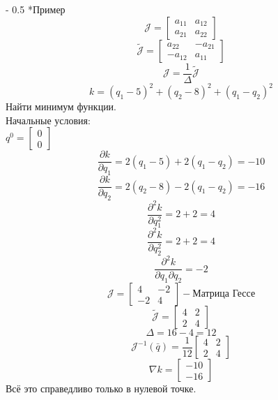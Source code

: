 \documentclass[12pt,a5paper]{scrbook}
\makeatletter
\renewcommand\paragraph{\@startsection{paragraph}{4}{0mm}%
{-\baselineskip} %
{0.5\baselineskip} %
{\normalfont\bfseries}}%
\makeatother
\begin{document}
  \paragraph*{Пример}
  $$
    \mathcal{J} =
    \begin{bmatrix}
      a_{11} & a_{12}\\
      a_{21} & a_{22}
    \end{bmatrix}
  $$
  $$
    \tilde{\mathcal{J}} =
    \begin{bmatrix}
      a_{22} & -a_{21}\\
      -a_{12} & a_{11}
    \end{bmatrix}
  $$
  $$
    \mathcal{J} = \frac{1}{\Delta}\mathcal{\tilde{J}}
  $$  
  $$k = (q_1 - 5)^2 + (q_2 - 8)^2 + (q_1 - q_2)^2$$
  Найти минимум функции.\\
  Начальные условия:\\
  $q^0 = 
  \begin{bmatrix}
    0 \\ 
    0    
  \end{bmatrix}$
  $$\frac{\partial k}{\partial q_1} = 2(q_1 - 5) + 2(q_1 - q_2) = -10$$
  $$\frac{\partial k}{\partial q_2} = 2(q_2 - 8) - 2(q_1 - q_2) = -16$$
  $$\frac{\partial^2k}{\partial q_1^2} = 2 + 2 = 4$$
  $$\frac{\partial^2k}{\partial q_2^2} = 2 + 2 = 4$$
  $$\frac{\partial^2k}{\partial q_1 \partial q_2} = -2$$  
  $$\mathcal{J} = 
  \begin{bmatrix}
    4 & -2 \\
    -2 & 4
  \end{bmatrix} - \text{Матрица Гессе}$$
  $$\mathcal{\tilde{J}} = 
  \begin{bmatrix}
    4 & 2 \\
    2 & 4
  \end{bmatrix}  
  $$
  $$\Delta = 16 - 4 = 12$$
  $$\mathcal{J}^{-1}(\bar{q}) = \frac{1}{12}\begin{bmatrix}
    4 & 2 \\
    2 & 4
  \end{bmatrix}$$
  $$\nabla k = \begin{bmatrix}
    -10 \\
    -16
  \end{bmatrix}$$
  Всё это справедливо только в нулевой точке.
\end{document}
